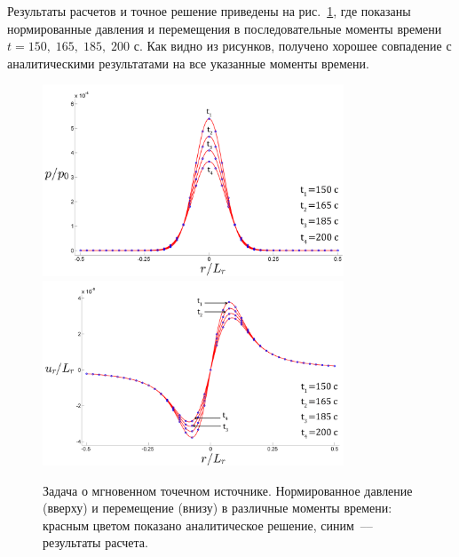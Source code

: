 Результаты расчетов и точное решение приведены на
рис.~\ref{fig::press_point_mom},
где показаны нормированные давления и перемещения в последовательные моменты времени
$t = 150, \; 165, \; 185, \; 200$ с. Как видно из рисунков, получено
хорошее совпадение с аналитическими результатами на все указанные моменты времени.

\begin{figure}[t!]
\centering
  \includegraphics[width=0.8\textwidth]{figs/press_point_mom2.png}\\
  \includegraphics[width=0.8\textwidth]{figs/disp_point_mom2.png}
  \caption{ Задача о мгновенном точечном источнике. Нормированное давление (вверху) и перемещение (внизу) в различные моменты времени: красным
    цветом показано аналитическое решение, синим~--– результаты расчета.}
  \label{fig::press_point_mom}
\end{figure}
%


